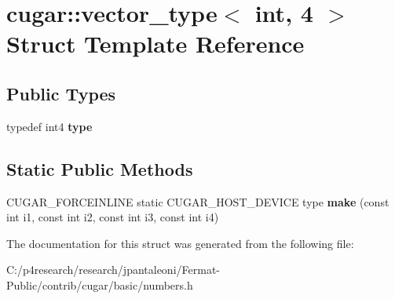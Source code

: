 \hypertarget{structcugar_1_1vector__type_3_01int_00_014_01_4}{}\section{cugar\+:\+:vector\+\_\+type$<$ int, 4 $>$ Struct Template Reference}
\label{structcugar_1_1vector__type_3_01int_00_014_01_4}
\subsection*{Public Types}
\begin{DoxyCompactItemize}
\item 
\mbox{\label{structcugar_1_1vector__type_3_01int_00_014_01_4_ac7cfedacb7f83535b92652c1c52d856f}} 
typedef int4 {\bfseries type}
\end{DoxyCompactItemize}
\subsection*{Static Public Methods}
\begin{DoxyCompactItemize}
\item 
\mbox{\label{structcugar_1_1vector__type_3_01int_00_014_01_4_a682f72cef8263fcb8b530761ec3ff52d}} 
C\+U\+G\+A\+R\+\_\+\+F\+O\+R\+C\+E\+I\+N\+L\+I\+NE static C\+U\+G\+A\+R\+\_\+\+H\+O\+S\+T\+\_\+\+D\+E\+V\+I\+CE type {\bfseries make} (const int i1, const int i2, const int i3, const int i4)
\end{DoxyCompactItemize}


The documentation for this struct was generated from the following file\+:\begin{DoxyCompactItemize}
\item 
C\+:/p4research/research/jpantaleoni/\+Fermat-\/\+Public/contrib/cugar/basic/numbers.\+h\end{DoxyCompactItemize}
